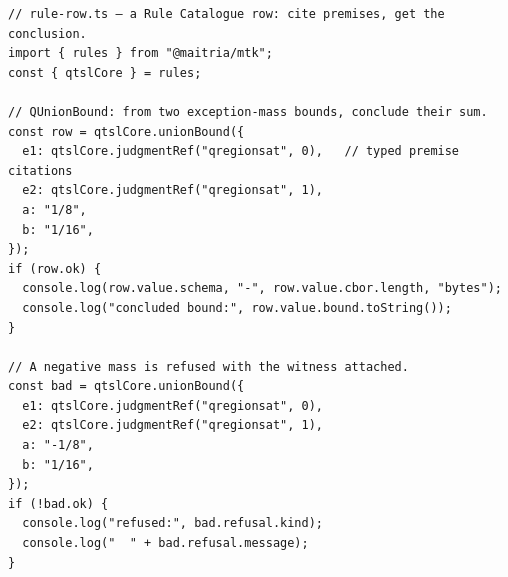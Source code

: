 \begin{Verbatim}[fontsize=\small,frame=leftline,rulecolor=\color{accentmid},framesep=3mm,xleftmargin=3mm]
// rule-row.ts — a Rule Catalogue row: cite premises, get the conclusion.
import { rules } from "@maitria/mtk";
const { qtslCore } = rules;

// QUnionBound: from two exception-mass bounds, conclude their sum.
const row = qtslCore.unionBound({
  e1: qtslCore.judgmentRef("qregionsat", 0),   // typed premise citations
  e2: qtslCore.judgmentRef("qregionsat", 1),
  a: "1/8",
  b: "1/16",
});
if (row.ok) {
  console.log(row.value.schema, "-", row.value.cbor.length, "bytes");
  console.log("concluded bound:", row.value.bound.toString());
}

// A negative mass is refused with the witness attached.
const bad = qtslCore.unionBound({
  e1: qtslCore.judgmentRef("qregionsat", 0),
  e2: qtslCore.judgmentRef("qregionsat", 1),
  a: "-1/8",
  b: "1/16",
});
if (!bad.ok) {
  console.log("refused:", bad.refusal.kind);
  console.log("  " + bad.refusal.message);
}
\end{Verbatim}
